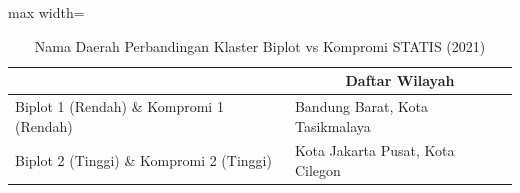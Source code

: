 \begin{table}[H]
\centering
\caption{Nama Daerah Perbandingan Klaster Biplot vs Kompromi STATIS (2021)} \label{tab:sample2biplot_comp_name_2021}
\begin{adjustbox}{max width=\textwidth}
\begin{tabular}{|>{\centering\arraybackslash}p{4cm}|p{10cm}|}
\hline
\multicolumn{1}{|c|}{\textbf{Kategori}} & \multicolumn{1}{c|}{\textbf{Daftar Wilayah}} \\
\hline
Biplot 1 (Rendah) \& Kompromi 1 (Rendah) & Bandung Barat, Kota Tasikmalaya \\
\hline
Biplot 2 (Tinggi) \& Kompromi 2 (Tinggi) & Kota Jakarta Pusat, Kota Cilegon \\
\hline
\end{tabular}
\end{adjustbox}
\end{table}